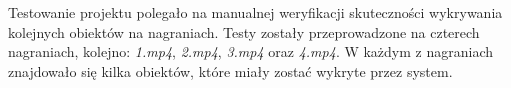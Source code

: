 
Testowanie projektu polegało na manualnej weryfikacji skuteczności wykrywania kolejnych obiektów na
nagraniach.
Testy zostały przeprowadzone na czterech nagraniach, kolejno: \textit{1.mp4}, \textit{2.mp4}, \textit{3.mp4}
oraz \textit{4.mp4}.
W każdym z nagraniach znajdowało się kilka obiektów, które miały zostać wykryte przez system.

